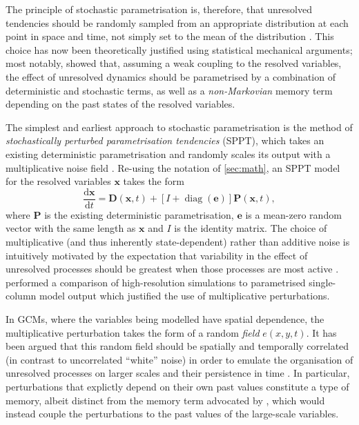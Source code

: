 \documentclass[titlepage,twoside]{article}
\numberwithin{equation}{section}
\newcommand{\diff}[2]{\frac{\mathrm{d} #1}{\mathrm{d} #2}}
\renewcommand\vec{\bm}
\begin{document}
The principle of stochastic parametrisation is, therefore, that unresolved
tendencies should be randomly sampled from an appropriate distribution at each
point in space and time, not simply set to the mean of the distribution
\parencite{franzke2015}. This choice has now been theoretically justified using
statistical mechanical arguments; most notably,
\textcite{wouters2012,wouters2013} showed that, assuming a weak coupling to the
resolved variables, the effect of unresolved dynamics should be parametrised by
a combination of deterministic and stochastic terms, as well as a
\emph{non-Markovian} memory term depending on the past states of the resolved
variables.

The simplest and earliest approach to stochastic parametrisation is the method
of \emph{stochastically perturbed parametrisation tendencies} (SPPT), which
takes an existing deterministic parametrisation and randomly scales its output
with a multiplicative noise field \parencite{palmer2019,christensen2020}.
Re-using the notation of \cref{sec:math}, an SPPT model for the resolved
variables $\vec{x}$ takes the form
\begin{equation*}
    \diff{\vec{x}}{t}
        = \vec{D}(\vec{x},t)
        + [I + \operatorname{diag}(\vec{e})] \vec{P}(\vec{x}, t),
\end{equation*}
where $\vec{P}$ is the existing deterministic parametrisation, $\vec{e}$ is a
mean-zero random vector with the same length as $\vec{x}$ and $I$ is the
identity matrix. The choice of multiplicative (and thus inherently
state-dependent) rather than additive noise is intuitively motivated by the
expectation that variability in the effect of unresolved processes should be
greatest when those processes are most active \parencite{franzke2015}.
\textcite{christensen2020} performed a comparison of high-resolution
simulations to parametrised single-column model output which justified the use
of multiplicative perturbations.

In GCMs, where the variables being modelled have spatial dependence, the
multiplicative perturbation takes the form of a random \emph{field}
$e(x,y,t)$. It has been argued that this random field should be spatially and
temporally correlated (in contrast to uncorrelated ``white'' noise) in order to
emulate the organisation of unresolved processes on larger scales and their
persistence in time \parencite{christensen2022,franzke2015}. In particular,
perturbations that explictly depend on their own past values constitute a type
of memory, albeit distinct from the memory term advocated by
\textcite{wouters2012,wouters2013}, which would instead couple the
perturbations to the past values of the large-scale variables.
\end{document}
